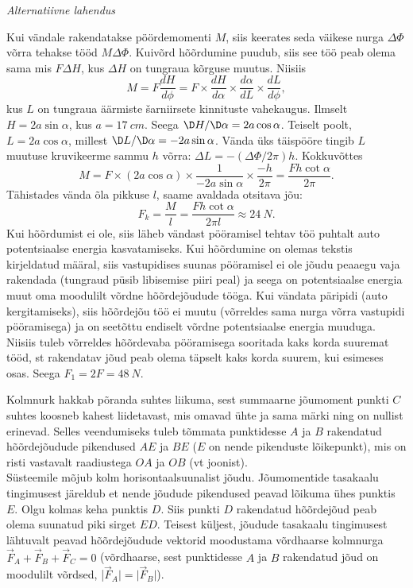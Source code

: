 \documentclass[10pt]{article}
\begin{document}
{\vspace{0.5\baselineskip}

\emph{Alternatiivne lahendus}

Kui vändale rakendatakse pöördemomenti $M$, siis keerates seda
väikese nurga $\Delta\Phi$ võrra tehakse tööd $M\Delta\Phi$. Kuivõrd hõõrdumine puudub, siis see
töö peab olema sama mis $F\Delta H$, kus $\Delta H$ on tungraua kõrguse muutus. Niisiis
\[
M=F \frac{d H}{d \phi}=F \times \frac{d H}{d \alpha} \times \frac{d \alpha}{d L} \times \frac{d L}{d \phi},
\]
kus $L$ on tungraua äärmiste šarniirsete kinnituste vahekaugus. Ilmselt $H = 2a \sin\alpha$,
kus $a = \SI{17}{cm}$. Seega $\D H/\D\alpha = 2a \cos\alpha$. Teiselt poolt, $L = 2a \cos\alpha$, millest $\D L/\D\alpha =
-2a \sin\alpha$. Vända üks täispööre tingib $L$ muutuse kruvikeerme sammu $h$ võrra: $\Delta L =
-(\Delta\Phi/2\pi)h$. Kokkuvõttes
\[
M=F \times(2 a \cos \alpha) \times \frac{1}{-2 a \sin \alpha} \times \frac{-h}{2 \pi}=\frac{F h \cot \alpha}{2 \pi}.
\]
Tähistades vända õla pikkuse $l$, saame avaldada otsitava jõu:
\[
F_{k}=\frac{M}{l}=\frac{F h \cot \alpha}{2 \pi l} \approx \SI{24}{N}.
\]
\osa Kui hõõrdumist ei ole, siis läheb vändast pööramisel tehtav töö puhtalt auto
potentsiaalse energia kasvatamiseks. Kui hõõrdumine on olemas tekstis kirjeldatud
määral, siis vastupidises suunas pööramisel ei ole jõudu peaaegu vaja rakendada
(tungraud püsib libisemise piiri peal) ja seega on potentsiaalse energia muut oma
moodulilt võrdne hõõrdejõudude tööga. Kui vändata päripidi (auto kergitamiseks),
siis hõõrdejõu töö ei muutu (võrreldes sama nurga võrra vastupidi pööramisega) ja
on seetõttu endiselt võrdne potentsiaalse energia muuduga. Niisiis tuleb võrreldes
hõõrdevaba pööramisega sooritada kaks korda suuremat tööd, st rakendatav jõud
peab olema täpselt kaks korda suurem, kui esimeses osas. Seega $F_1 = 2F = \SI{48}{N}$.
\probend
\bigskip


\solu
\osa Kolmnurk hakkab põranda suhtes liikuma, sest summaarne jõumoment punkti $C$ suhtes koosneb kahest liidetavast, mis omavad ühte ja sama märki ning on nullist erinevad. Selles veendumiseks tuleb tõmmata punktidesse $A$ ja $B$ rakendatud hõõrdejõudude pikendused $AE$ ja $BE$ ($E$ on nende pikenduste lõikepunkt), mis on risti vastavalt raadiustega $OA$ ja $OB$ (vt joonist).\\
\osa Süsteemile mõjub kolm horisontaalsuunalist jõudu. Jõumomentide tasakaalu tingimusest järeldub et nende jõudude pikendused peavad lõikuma ühes punktis $E$. Olgu kolmas keha punktis $D$. Siis punkti $D$ rakendatud hõõrdejõud peab olema suunatud piki sirget $ED$. Teisest küljest, jõudude tasakaalu tingimusest lähtuvalt peavad hõõrdejõudude vektorid moodustama võrdhaarse kolmnurga $\vec F_A+\vec F_B+\vec F_C = 0$ (võrdhaarse, sest punktidesse $A$ ja $B$ rakendatud jõud on moodulilt võrdsed, |$\vec F_A| = |\vec F_B|$).

}
\end{document}
